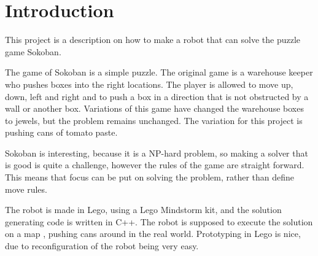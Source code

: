 \section{Introduction}

This project is a description on how to make a robot that can solve the puzzle game Sokoban.

The game of Sokoban is a simple puzzle.
The original game is a warehouse keeper who pushes boxes into the right locations.
The player is allowed to move up, down, left and right and to push a box in a direction that is not obstructed by a wall or another box.
Variations of this game have changed the warehouse boxes to jewels, but the problem remains unchanged.
The variation for this project is pushing cans of tomato paste.

Sokoban is interesting, because it is a NP-hard problem, so making a solver that is good is quite a challenge, however the rules of the game are straight forward.
This means that focus can be put on solving the problem, rather than define move rules.

The robot is made in Lego, using a Lego Mindstorm kit, and the solution generating code is written in C++. 
The robot is supposed to execute the solution on a map , pushing cans around in the real world.
Prototyping in Lego is nice, due to reconfiguration of the robot being very easy.